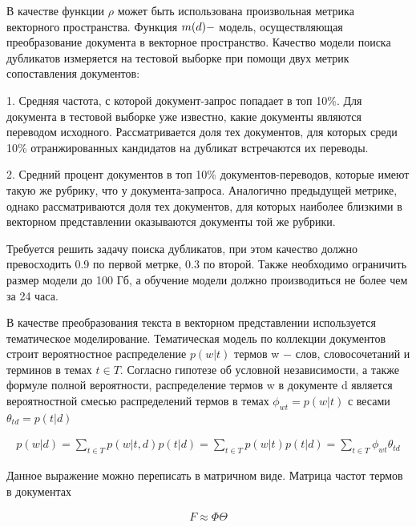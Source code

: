 \documentclass[12pt, twoside]{article}
\begin{document}
В качестве функции $\rho$ может быть использована произвольная метрика векторного пространства. Функция  $m(d) \--$ модель, осуществляющая преобразование документа в векторное пространство. Качество модели поиска дубликатов измеряется на тестовой выборке при помощи двух метрик сопоставления документов:

1. Средняя частота, с которой документ-запрос попадает в топ 10\%.  Для документа в тестовой выборке уже известно, какие документы являются переводом исходного. Рассматривается доля тех документов, для которых среди 10\% отранжированных кандидатов на дубликат встречаются их переводы. 

2. Средний процент документов в топ 10\% документов-переводов, которые имеют такую же рубрику, что у документа-запроса. Аналогично предыдущей метрике, однако рассматриваются доля тех документов, для которых наиболее близкими в векторном представлении оказываются документы той же рубрики.

Требуется решить задачу поиска дубликатов, при этом качество должно превосходить 0.9 по первой метрке, 0.3 по второй. Также необходимо ограничить размер модели до 100 Гб, а обучение модели должно производиться не более чем за 24 часа.

В качестве преобразования текста в векторном представлении используется тематическое моделирование. Тематическая модель \cite{basetematic}  по коллекции документов строит вероятностное распределение $p(w|t)$ термов w $-$ слов, словосочетаний и терминов в темах $t \in T$. Согласно гипотезе об условной независимости, а также формуле полной вероятности, распределение термов w в документе d является вероятностной смесью распределений термов в темах $\phi_{wt} = p(w|t)$ с весами $\theta_{td}=p(t|d)$

\begin{equation} \label{eq1}
\begin{split}
p(w|d) = \sum_{t \in T} p(w|t, d)p(t|d) = \sum_{t \in T} p(w|t)p(t|d) =\sum_{t\in T}\phi_{wt}\theta_{td}
\end{split}
\end{equation}

Данное выражение можно переписать в матричном виде. Матрица частот термов в документах

\begin{equation} \label{eq1}
\begin{split}
F \approx \Phi \Theta
\end{split}
\end{equation}
\end{document}
